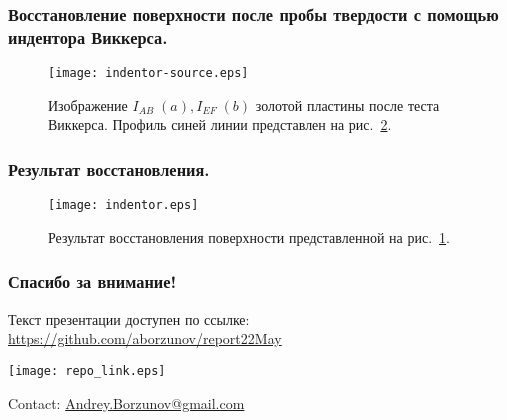 \documentclass{beamer}
\begin{document}
\begin{frame}
    \frametitle{Восстановление поверхности после пробы твердости с помощью индентора Виккерса.}
    \begin{figure}
        \texttt{[image: indentor-source.eps]}
        \caption{Изображение $I_{AB} \; (a), I_{EF} \; (b)$ золотой пластины после теста Виккерса. Профиль синей линии представлен на рис.~\ref{fig:indentor}.}
        {\label{fig:indentor-source}}%
    \end{figure}
\end{frame}


\begin{frame}
    \frametitle{Результат восстановления.}
    \begin{figure}
        \texttt{[image: indentor.eps]}
        \caption{Результат восстановления поверхности представленной на рис.~\ref{fig:indentor-source}.}
        {\label{fig:indentor}}%
    \end{figure}
\end{frame}

\begin{frame}[allowframebreaks]
    
\end{frame}

\begin{frame}
    \frametitle{Спасибо за внимание!}
    Текст презентации доступен по ссылке:
    \url{https://github.com/aborzunov/report22May}
    \begin{figure*}
        \texttt{[image: repo\_link.eps]}
    \end{figure*}
     Contact: \url{Andrey.Borzunov@gmail.com}

\end{frame}
\end{document}
